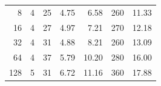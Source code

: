 \begin{table}[h!]
\begin{tabular}{rrrrrrr}
8                      & 4                          & 25                     & 4.75                                                                              & 6.58                                                                            & 260                                                                                  & 11.33                                                                            \\
16                     & 4                          & 27                     & 4.97                                                                              & 7.21                                                                            & 270                                                                                  & 12.18                                                                            \\
32                     & 4                          & 31                     & 4.88                                                                              & 8.21                                                                            & 260                                                                                  & 13.09                                                                            \\
64                     & 4                          & 37                     & 5.79                                                                              & 10.20                                                                           & 280                                                                                  & 16.00                                                                            \\
128                    & 5                          & 31                     & 6.72                                                                              & 11.16                                                                           & 360                                                                                  & 17.88                                                                           
\end{tabular}
\end{table}

